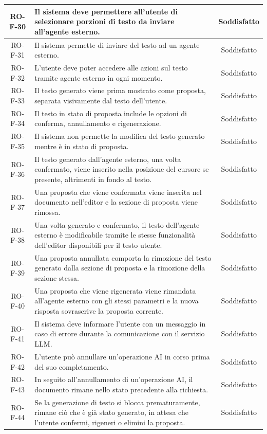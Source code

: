 \documentclass[11pt,a4paper]{article}
\begin{document}
\begin{longtable}{|c|p{11cm}|c|}
\hline
RO-F-30 & Il sistema deve permettere all'utente di selezionare porzioni di testo da inviare all'agente esterno. & Soddisfatto \\
\hline
RO-F-31 & Il sistema permette di inviare del testo ad un agente esterno. & Soddisfatto \\
\hline
RO-F-32 & L'utente deve poter accedere alle azioni sul testo tramite agente esterno in ogni momento. & Soddisfatto \\
\hline
RO-F-33 & Il testo generato viene prima mostrato come proposta, separata visivamente dal testo dell'utente. & Soddisfatto \\
\hline
RO-F-34 & Il testo in stato di proposta include le opzioni di conferma, annullamento e rigenerazione. & Soddisfatto \\
\hline
RO-F-35 & Il sistema non permette la modifica del testo generato mentre è in stato di proposta. & Soddisfatto \\
\hline
RO-F-36 & Il testo generato dall'agente esterno, una volta confermato, viene inserito nella posizione del cursore se presente, altrimenti in fondo al testo. & Soddisfatto \\
\hline
RO-F-37 & Una proposta che viene confermata viene inserita nel documento nell'editor e la sezione di proposta viene rimossa. & Soddisfatto \\
\hline
RO-F-38 & Una volta generato e confermato, il testo dell'agente esterno è modificabile tramite le stesse funzionalità dell'editor disponibili per il testo utente. & Soddisfatto \\
\hline
RO-F-39 & Una proposta annullata comporta la rimozione del testo generato dalla sezione di proposta e la rimozione della sezione stessa. & Soddisfatto \\
\hline
RO-F-40 & Una proposta che viene rigenerata viene rimandata all'agente esterno con gli stessi parametri e la nuova risposta sovrascrive la proposta corrente. & Soddisfatto \\
\hline
RO-F-41 & Il sistema deve informare l'utente con un messaggio in caso di errore durante la comunicazione con il servizio LLM. & Soddisfatto \\
\hline
RO-F-42 & L'utente può annullare un'operazione AI in corso prima del suo completamento. & Soddisfatto \\
\hline
RO-F-43 & In seguito all'annullamento di un'operazione AI, il documento rimane nello stato precedente alla richiesta. & Soddisfatto \\
\hline
RO-F-44 & Se la generazione di testo si blocca prematuramente, rimane ciò che è già stato generato, in attesa che l'utente confermi, rigeneri o elimini la proposta. & Soddisfatto \\

\end{longtable}
\end{document}
